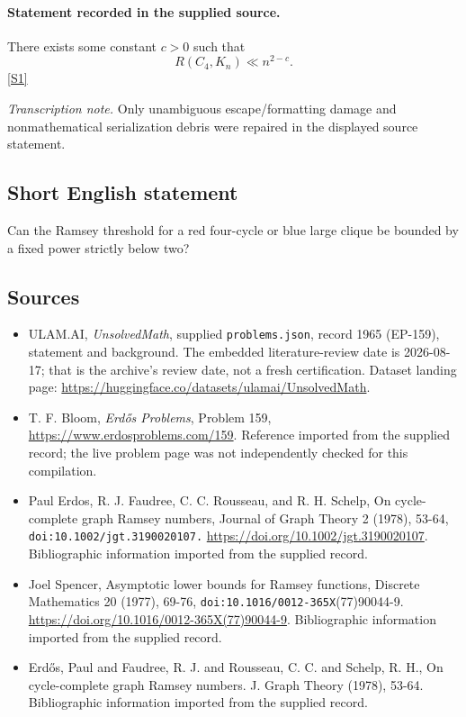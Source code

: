 \documentclass[11pt,a4paper]{article}
\newcommand{\sref}[2]{\hyperlink{source:#1:#2}{[S#2]}}
\begin{document}
\paragraph{Statement recorded in the supplied source.}
There exists some constant $c>0$ such that
\[R(C_4,K_n) \ll n^{2-c}.\] \sref{1965}{1}

{\small\emph{Transcription note.} Only unambiguous escape/formatting damage and nonmathematical serialization debris were repaired in the displayed source statement.}

\subsection{Short English statement}

Can the Ramsey threshold for a red four-cycle or blue large clique be bounded by a fixed power strictly below two?

\subsection{Sources}

{\small

\begin{itemize}

\item[\hypertarget{source:1965:1}{S1}] ULAM.AI, \emph{UnsolvedMath}, supplied \texttt{problems.json}, record 1965 (EP-159), statement and background. The embedded literature-review date is 2026-08-17; that is the archive’s review date, not a fresh certification. Dataset landing page: \url{https://huggingface.co/datasets/ulamai/UnsolvedMath}.

\item[\hypertarget{source:1965:2}{S2}] T. F. Bloom, \emph{Erdős Problems}, Problem 159, \url{https://www.erdosproblems.com/159}. Reference imported from the supplied record; the live problem page was not independently checked for this compilation.

\item[\hypertarget{source:1965:3}{S3}] Paul Erdos, R. J. Faudree, C. C. Rousseau, and R. H. Schelp, On cycle-complete graph Ramsey numbers, Journal of Graph Theory 2 (1978), 53-64, \nolinkurl{doi:10.1002/jgt.3190020107.} \url{https://doi.org/10.1002/jgt.3190020107}. Bibliographic information imported from the supplied record.

\item[\hypertarget{source:1965:4}{S4}] Joel Spencer, Asymptotic lower bounds for Ramsey functions, Discrete Mathematics 20 (1977), 69-76, \nolinkurl{doi:10.1016/0012-365X}(77)90044-9. \url{https://doi.org/10.1016/0012-365X(77)90044-9}. Bibliographic information imported from the supplied record.

\item[\hypertarget{source:1965:5}{S5}] Erd\H{o}s, Paul and Faudree, R. J. and Rousseau, C. C. and Schelp, R. H., On cycle-complete graph Ramsey numbers. J. Graph Theory (1978), 53-64. Bibliographic information imported from the supplied record.

\end{itemize}

}

\label{end:1965}
\end{document}
